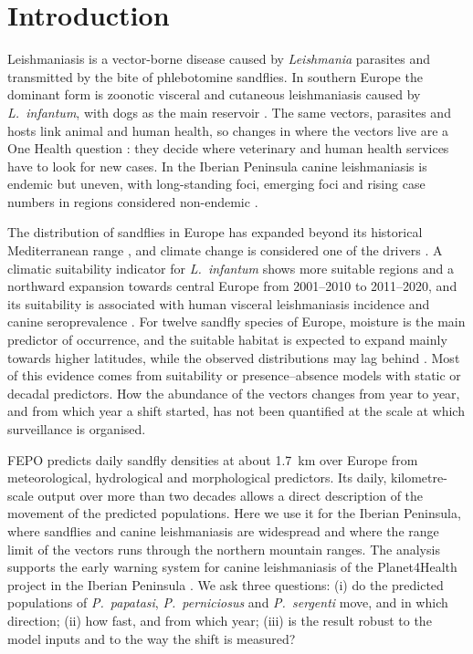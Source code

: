 \documentclass[pdflatex,sn-basic]{sn-jnl}
\newcommand{\spn}[1]{\textit{#1}}
\begin{document}
\maketitle

\section{Introduction}\label{sec:intro}

Leishmaniasis is a vector-borne disease caused by \spn{Leishmania} parasites and transmitted by the bite of phlebotomine sandflies. In southern Europe the dominant form is zoonotic visceral and cutaneous leishmaniasis caused by \spn{L.~infantum}, with dogs as the main reservoir \citep{Berriatua2021, Maia2023}. The same vectors, parasites and hosts link animal and human health, so changes in where the vectors live are a One Health question \citep{Cosma2024}: they decide where veterinary and human health services have to look for new cases. In the Iberian Peninsula canine leishmaniasis is endemic but uneven, with long-standing foci, emerging foci and rising case numbers in regions considered non-endemic \citep{Galvez2020, Maia2026}.

The distribution of sandflies in Europe has expanded beyond its historical Mediterranean range \citep{Maroli2013, Medlock2014}, and climate change is considered one of the drivers \citep{Koch2017, Chalghaf2018}. A climatic suitability indicator for \spn{L.~infantum} shows more suitable regions and a northward expansion towards central Europe from 2001--2010 to 2011--2020, and its suitability is associated with human visceral leishmaniasis incidence and canine seroprevalence \citep{Carvalho2024, Paz2024}. For twelve sandfly species of Europe, moisture is the main predictor of occurrence, and the suitable habitat is expected to expand mainly towards higher latitudes, while the observed distributions may lag behind \citep{Wang2025}. Most of this evidence comes from suitability or presence--absence models with static or decadal predictors. How the abundance of the vectors changes from year to year, and from which year a shift started, has not been quantified at the scale at which surveillance is organised.

FEPO \citep{Soheili2025} predicts daily sandfly densities at about 1.7~km over Europe from meteorological, hydrological and morphological predictors. Its daily, kilometre-scale output over more than two decades allows a direct description of the movement of the predicted populations. Here we use it for the Iberian Peninsula, where sandflies and canine leishmaniasis are widespread and where the range limit of the vectors runs through the northern mountain ranges. The analysis supports the early warning system for canine leishmaniasis of the Planet4Health project in the Iberian Peninsula \citep{Maia2026}. We ask three questions: (i) do the predicted populations of \spn{P.~papatasi}, \spn{P.~perniciosus} and \spn{P.~sergenti} move, and in which direction; (ii) how fast, and from which year; (iii) is the result robust to the model inputs and to the way the shift is measured?
\end{document}
